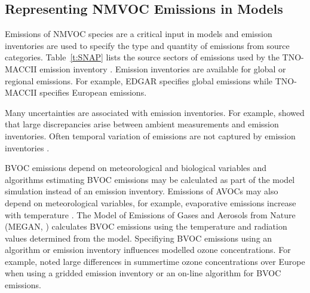 \vspace{-6mm}
\subsection{Representing NMVOC Emissions in Models}
\vspace{-2mm}
Emissions of NMVOC species are a critical input in models and emission inventories are used to specify the type and quantity of emissions from source categories.
Table~\ref{t:SNAP} lists the source sectors of emissions used by the TNO-MACCII emission inventory \citep{Kuenen:2014}.
Emission inventories are available for global or regional emissions.
For example, EDGAR \citep{Olivier:2001} specifies global emissions while TNO-MACCII \citep{Kuenen:2014} specifies European emissions.

Many uncertainties are associated with emission inventories.
For example, \citet{Coll:2010} showed that large discrepancies arise between ambient measurements and emission inventories.
Often temporal variation of emissions are not captured by emission inventories \citep{Boynard:2014}. 

BVOC emissions depend on meteorological and biological variables and algorithms estimating BVOC emissions may be calculated as part of the model simulation instead of an emission inventory.
Emissions of AVOCs may also depend on meteorological variables, for example, evaporative emissions increase with temperature \citep{Rubin:2006}.
The Model of Emissions of Gases and Aerosols from Nature (MEGAN, \citet{Guenther:2006, Guenther:2012}) calculates BVOC emissions using the temperature and radiation values determined from the model.
Specifiying BVOC emissions using an algorithm or emission inventory influences modelled ozone concentrations. 
For example, \citet{Curci:2009} noted large differences in summertime ozone concentrations over Europe when using a gridded emission inventory or an on-line algorithm for BVOC emissions.


